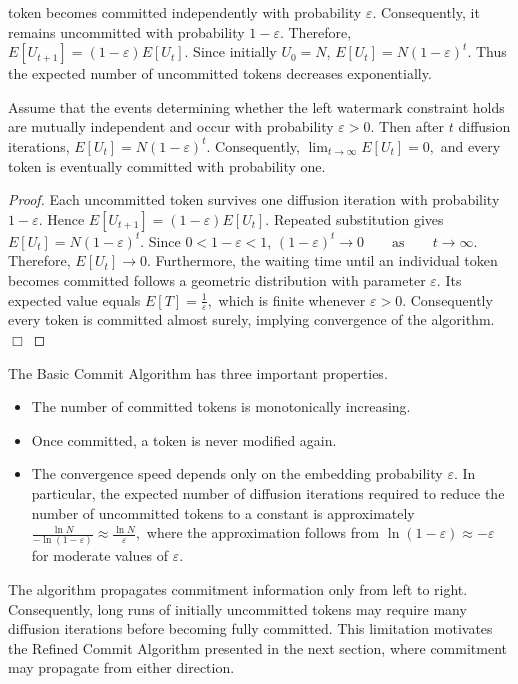 \documentclass[a4paper,11pt]{llncs}
\begin{document}
token becomes committed independently with probability $\varepsilon$.
Consequently, it remains uncommitted with probability $1-\varepsilon$.
Therefore,
$
E[U_{t+1}]
=
(1-\varepsilon)E[U_t].
$
Since initially $U_0=N$,
$
E[U_t]
=
N(1-\varepsilon)^t.
$
Thus the expected number of uncommitted tokens decreases exponentially.
\begin{theorem}
Assume that the events determining whether the left watermark constraint
holds are mutually independent and occur with probability
$\varepsilon>0$. Then after $t$ diffusion iterations,
$
E[U_t]
=
N(1-\varepsilon)^t.
$
Consequently,
$
\lim_{t\rightarrow\infty}E[U_t]=0,
$
and every token is eventually committed with probability one.
\end{theorem}
\begin{proof}
Each uncommitted token survives one diffusion iteration with probability
$1-\varepsilon$. Hence
$
E[U_{t+1}]
=
(1-\varepsilon)E[U_t].
$
Repeated substitution gives
$
E[U_t]
=
N(1-\varepsilon)^t.
$
Since $0<1-\varepsilon<1$,
$
(1-\varepsilon)^t\rightarrow0
\qquad\text{as}\qquad
t\rightarrow\infty.
$
Therefore,
$
E[U_t]\rightarrow0.
$
Furthermore, the waiting time until an individual token becomes
committed follows a geometric distribution with parameter
$\varepsilon$. Its expected value equals
$
E[T]=\frac1{\varepsilon},
$
which is finite whenever $\varepsilon>0$. Consequently every token is
committed almost surely, implying convergence of the algorithm.
\hfill$\Box$
\end{proof}
%
The Basic Commit Algorithm has three important properties.
\begin{itemize}
\item The number of committed tokens is monotonically increasing.
\item Once committed, a token is never modified again.
\item The convergence speed depends only on the embedding probability
$\varepsilon$. In particular, the expected number of diffusion
iterations required to reduce the number of uncommitted tokens to a
constant is approximately
$
\frac{\ln N}{-\ln(1-\varepsilon)}
\approx
\frac{\ln N}{\varepsilon},
$
where the approximation follows from
$\ln(1-\varepsilon)\approx-\varepsilon$ for moderate values of
$\varepsilon$.
\end{itemize}

The algorithm propagates commitment information only from left to right.
Consequently, long runs of initially uncommitted tokens may require many
diffusion iterations before becoming fully committed. This limitation
motivates the Refined Commit Algorithm presented in the next section,
where commitment may propagate from either direction.
\end{document}

